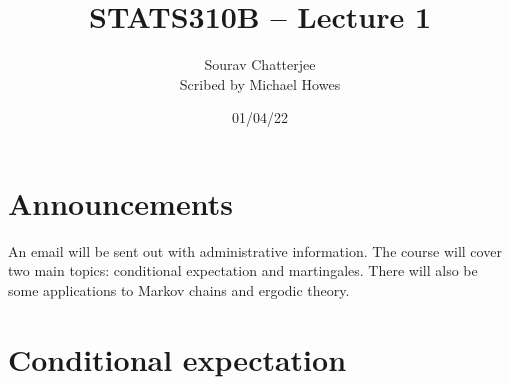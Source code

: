 




\title{STATS310B -- Lecture 1}
\author{Sourav Chatterjee\\ Scribed by Michael Howes}
\date{01/04/22}

\pagestyle{fancy}
\fancyhf{}


\maketitle
\tableofcontents
\section{Announcements}
An email will be sent out with administrative information. The course will cover two main topics: conditional expectation and martingales. There will also be some applications to Markov chains and ergodic theory.
\section{Conditional expectation}
